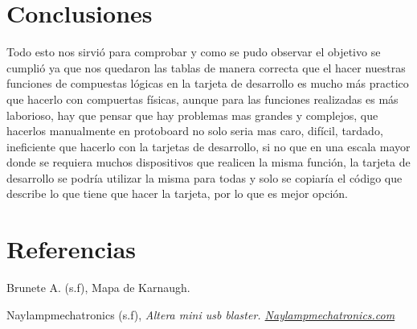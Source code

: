 \documentclass{article}
\begin{document}
\begin{multicols}{2}
	
\section{Conclusiones}\label{sec:conclusion}
Todo esto nos sirvió para comprobar y como se pudo observar el objetivo se cumplió ya que nos quedaron las tablas de manera correcta que el hacer nuestras funciones de compuestas lógicas en la tarjeta de desarrollo es mucho más practico que hacerlo con compuertas físicas, aunque para las funciones realizadas es más laborioso, hay que pensar que hay problemas mas grandes y complejos, que hacerlos manualmente en protoboard no solo seria mas caro, difícil, tardado, ineficiente que hacerlo con la tarjetas de desarrollo, si no que en una escala mayor donde se requiera muchos dispositivos que realicen la misma función, la tarjeta de desarrollo se podría utilizar la misma para todas y solo se copiaría el código que describe lo que tiene que hacer la tarjeta, por lo que es mejor opción.
\section*{Referencias}\label{sec:referencias}	
Brunete A. (s.f), Mapa de Karnaugh.

Naylampmechatronics (s.f), \it{Altera mini usb blaster}. \href{https://naylampmechatronics.com/programadores/411-altera-mini-usb-blaster.html}{Naylampmechatronics.com}

\end{multicols}
\end{document}
